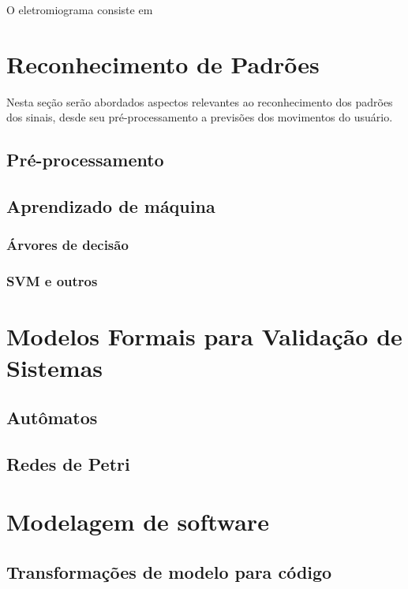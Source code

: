 O eletromiograma consiste em 


\section{Reconhecimento de Padrões}
\label{patternrec}
Nesta seção serão abordados aspectos relevantes ao reconhecimento dos padrões dos sinais, desde seu pré-processamento a previsões dos movimentos do usuário.
\subsection{Pré-processamento}
\subsection{Aprendizado de máquina}
\subsubsection{Árvores de decisão}
\subsubsection{SVM e outros}


\section{Modelos Formais para Validação de Sistemas}
\label{sec:modelosformais}
\subsection{Autômatos}
\subsection{Redes de Petri}

\section{Modelagem de software}
\label{sec:modelagem}
\subsection{Transformações de modelo para código}